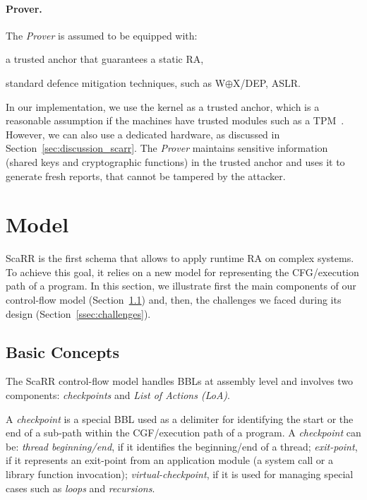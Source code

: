 \paragraph{Prover.}
The \emph{Prover} is assumed to be equipped with:
\begin{enumerate*}[label=(\roman*)]
	\item a trusted anchor that guarantees a static RA,
	\item standard defence mitigation techniques, such as W$\oplus$X/DEP, ASLR.
\end{enumerate*}
In our implementation, we use the kernel as a trusted anchor, which is a 
reasonable assumption if the machines have trusted modules such as a 
TPM~\cite{tomlinson2017introduction}. 
However, we can also use a dedicated hardware, as discussed in 
Section~\ref{sec:discussion_scarr}. The \emph{Prover} maintains sensitive 
information 
(\ie shared keys and cryptographic functions) in the trusted anchor and uses it 
to generate fresh reports, that cannot be tampered by the attacker. 

\section{Model}
\label{sec:model}

ScaRR is the first schema that allows to apply runtime RA on complex systems. 
To achieve this goal, it relies on a new model for representing the 
CFG/execution path of a program. In this section, we illustrate first the main 
components of our control-flow model (Section~\ref{ssec:basic_concepts}) and, 
then, the challenges we faced during its design (Section~\ref{ssec:challenges}).

\subsection{Basic Concepts}
\label{ssec:basic_concepts}

The ScaRR control-flow model handles BBLs at assembly level and involves two 
components: \emph{checkpoints} and \emph{List of Actions (LoA)}.


A \emph{checkpoint} is a special BBL used as a delimiter for identifying the 
start or the end of a sub-path within the CGF/execution path of a program. A 
\emph{checkpoint} can be: \emph{thread beginning/end}, if it identifies the 
beginning/end of a thread; \emph{exit-point}, if it represents an exit-point 
from an application module (\eg a system call or a library function 
invocation); \emph{virtual-checkpoint}, if it is used for managing special 
cases such as \emph{loops} and \emph{recursions}. 

